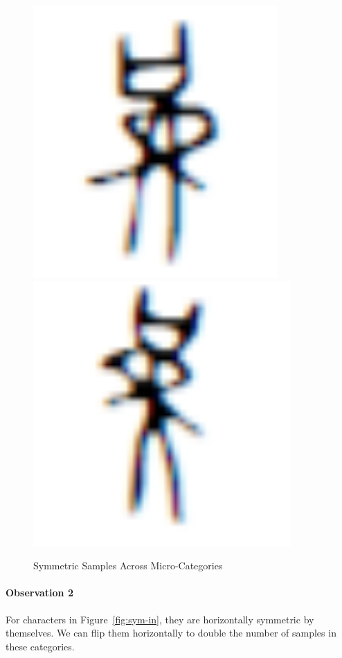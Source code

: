 \documentclass[journal]{IEEEtran}
\begin{document}
\begin{figure}[h]
\begin{minipage}{0.2\linewidth}
		\includegraphics[width=0.8\linewidth]{fig/observation-1-5.png}
		\includegraphics[width=0.8\linewidth]{fig/observation-1-6.png}
	\end{minipage}
	\caption{Symmetric Samples Across Micro-Categories}
	\label{fig:sym-across}
\end{figure}

\paragraph{Observation 2} For characters in Figure~\ref{fig:sym-in}, they are horizontally symmetric by themselves.
We can flip them horizontally to double the number of samples in these categories.
\end{document}
